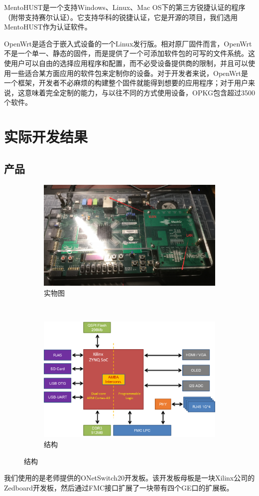 \documentclass{itecreport-zh}
\begin{document}
MentoHUST是一个支持Windows、Linux、Mac OS下的第三方锐捷认证的程序（附带支持赛尔认证）。它支持华科的锐捷认证，它是开源的项目，我们选用MentoHUST作为认证软件。


OpenWrt是适合于嵌入式设备的一个Linux发行版。相对原厂固件而言，OpenWrt不是一个单一、静态的固件，而是提供了一个可添加软件包的可写的文件系统。这使用户可以自由的选择应用程序和配置，而不必受设备提供商的限制，并且可以使用一些适合某方面应用的软件包来定制你的设备。对于开发者来说，OpenWrt是一个框架，开发者不必麻烦的构建整个固件就能得到想要的应用程序；对于用户来说，这意味着完全定制的能力，与以往不同的方式使用设备，OPKG包含超过3500个软件。

\chapter{实际开发结果}

\section{产品}
\begin{figure}[!h]
\centering
  \begin{subfigure}[b]{0.4\textwidth}
  \includegraphics[width=\textwidth]{product.png}
  \caption{实物图}
  \end{subfigure}
~
  \begin{subfigure}[b]{0.4\textwidth}
  \includegraphics[width=\textwidth]{ons20-hw.png}
  \caption{结构}
  \end{subfigure}
\end{figure}
我们使用的是老师提供的ONetSwitch20开发板。该开发板母板是一块Xilinx公司的Zedboard开发板，然后通过FMC接口扩展了一块带有四个GE口的扩展板。
\end{document}
